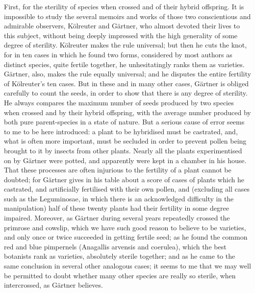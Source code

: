 \indent First, for the sterility of species when crossed and of their hybrid offspring. It is impossible to study the several memoirs and works of those two conscientious and admirable observers, K\"{o}lreuter and G\"{a}rtner, who almost devoted their lives to this subject, without being deeply impressed with the high generality of some degree of sterility. K\"{o}lreuter makes the rule universal; but then he cuts the knot, for in ten cases in which he found two forms, considered by most authors as distinct species, quite fertile together, he unhesitatingly ranks them as varieties. G\"{a}rtner, also, makes the rule equally universal; and he disputes the entire fertility of K\"{o}lreuter's ten cases. But in these and in many other cases, G\"{a}rtner is obliged carefully to count the seeds, in order to show that there is any degree of sterility. He always compares the maximum number of seeds produced by two species when crossed and by their hybrid offspring, with the average number produced by both pure parent-species in a state of nature. But a serious cause of error seems to me to be here introduced: a plant to be hybridised must be castrated, and, what is often more important, must be secluded in order to prevent pollen being brought to it by insects from other plants. Nearly all the plants experimentised on by G\"{a}rtner were potted, and apparently were kept in a chamber in his house. That these processes are often injurious to the fertility of a plant cannot be doubted; for G\"{a}rtner gives in his table about a score of cases of plants which he castrated, and artificially fertilised with their own pollen, and (excluding all cases such as the Leguminosae, in which there is an acknowledged difficulty in the manipulation) half of these twenty plants had their fertility in some degree impaired. Moreover, as G\"{a}rtner during several years repeatedly crossed the primrose and cowslip, which we have such good reason to believe to be varieties, and only once or twice succeeded in getting fertile seed; as he found the common red and blue pimpernels (Anagallis arvensis and coerulea), which the best botanists rank as varieties, absolutely sterile together; and as he came to the same conclusion in several other analogous cases; it seems to me that we may well be permitted to doubt whether many other species are really so sterile, when intercrossed, as G\"{a}rtner believes.\\
